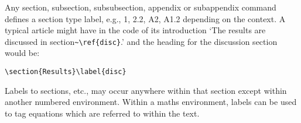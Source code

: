 \documentclass{OUP-EJ}
\begin{document}
Any section, subsection, subsubsection, appendix or subappendix
command defines a section type label, e.g., 1, 2.2, A2, A1.2 depending
on the context. A typical article might have in the code of its introduction
`The results are discussed in section\verb"~\ref{disc}".' and
the heading for the discussion section would be:
\small\begin{verbatim}
\section{Results}\label{disc}
\end{verbatim}\normalsize
Labels to sections, etc., may occur anywhere within that section except
within another numbered environment.
Within a maths environment, labels can be used to tag equations which are
referred to within the text.
\end{document}
